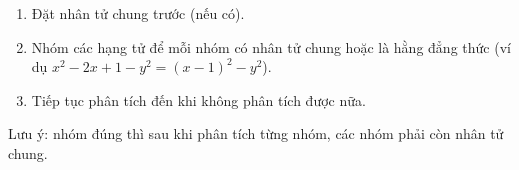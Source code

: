 \begin{enumerate}
\item Đặt nhân tử chung trước (nếu có).
\item Nhóm các hạng tử để mỗi nhóm có nhân tử chung hoặc là hằng đẳng thức (ví dụ $x^2-2x+1-y^2=(x-1)^2-y^2$).
\item Tiếp tục phân tích đến khi không phân tích được nữa.
\end{enumerate}
Lưu ý: nhóm đúng thì sau khi phân tích từng nhóm, các nhóm phải còn nhân tử chung.
